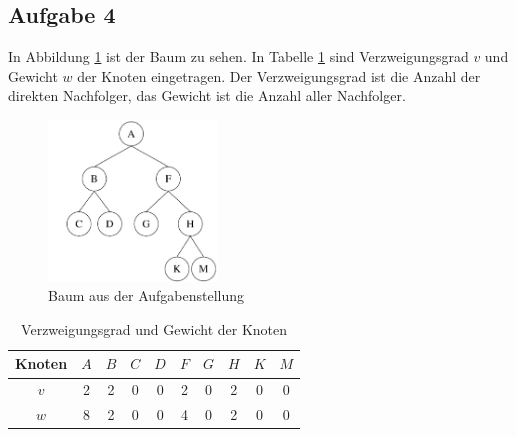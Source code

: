 \documentclass[11pt]{article}
\begin{document}
\subsection*{Aufgabe 4}
In Abbildung \ref{fig:a4_tree} ist der Baum zu sehen. In Tabelle
\ref{tab:degree_and_weight} sind Verzweigungsgrad $v$ und Gewicht $w$ der Knoten
eingetragen. Der Verzweigungsgrad ist die Anzahl der direkten Nachfolger, das
Gewicht ist die Anzahl aller Nachfolger.
\begin{figure}[h!]
  \centering
  \includegraphics[width=0.4\textwidth]{a4_tree.png}
  \caption{Baum aus der Aufgabenstellung}
  \label{fig:a4_tree}
\end{figure}
\begin{table}[h!]
  \centering
  \begin{tabular}{|c|c|c|c|c|c|c|c|c|c|}
  \hline
  Knoten & $A$ & $B$ & $C$ & $D$ & $F$ & $G$ & $H$ & $K$ & $M$ \\
  \hline
  $v$ & 2 & 2 & 0 & 0 & 2 & 0 & 2 & 0 & 0 \\
  \hline
  $w$ & 8 & 2 & 0 & 0 & 4 & 0 & 2 & 0 & 0 \\
  \hline
  \end{tabular}
  \caption{Verzweigungsgrad und Gewicht der Knoten}
  \label{tab:degree_and_weight}
\end{table}
\end{document}
